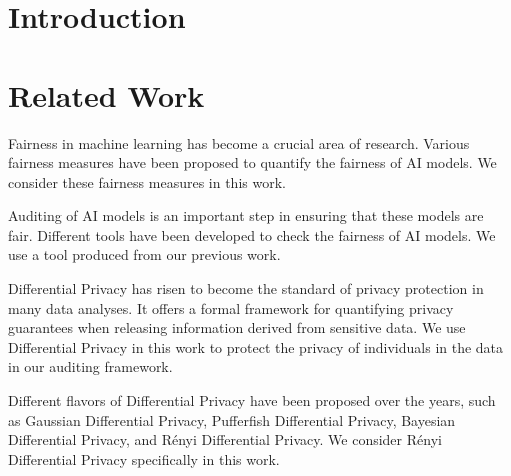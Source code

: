 \documentclass[manuscript,screen,review,anonymous]{acmart}
\begin{document}
\section{Introduction}






\section{Related Work}


Fairness in machine learning has become a crucial area of research\cite{barocas2023fairness}. Various fairness measures have been proposed to quantify\cite{yeh2024analyzing} the fairness of AI models\cite{pessach2022review,corbett2017algorithmic,vzliobaite2017measuring,hardt2016equality,corbett2017algorithmic,berk2021fairness,chouldechova2017fair,kleinberg2016inherent}. We consider these fairness measures in this work.

Auditing of AI models is an important step in ensuring that these models are fair\cite{ferrara2023fairness}. Different tools have been developed to check the fairness of AI models\cite{saleiro2018aequitas,bellamy2019ai,bird2020fairlearn}. We use a tool produced from our previous work\cite{yuan2024ensuring}.


Differential Privacy has risen to become the standard of privacy protection in many data analyses\cite{jiang2021applications}. It offers a formal framework for quantifying privacy guarantees when releasing information derived from sensitive data\cite{dwork2006calibrating,dwork2014algorithmic}. We use Differential Privacy in this work to protect the privacy of individuals in the data in our auditing framework.

Different flavors of Differential Privacy have been proposed over the years\cite{desfontaines2019sok}, such as Gaussian Differential Privacy\cite{dong2022gaussian}, Pufferfish Differential Privacy\cite{kifer2012rigorous}, Bayesian Differential Privacy\cite{triastcyn2020bayesian}, and R\'enyi Differential Privacy\cite{mironov2017renyi}. We consider R\'enyi Differential Privacy specifically in this work.
\end{document}
